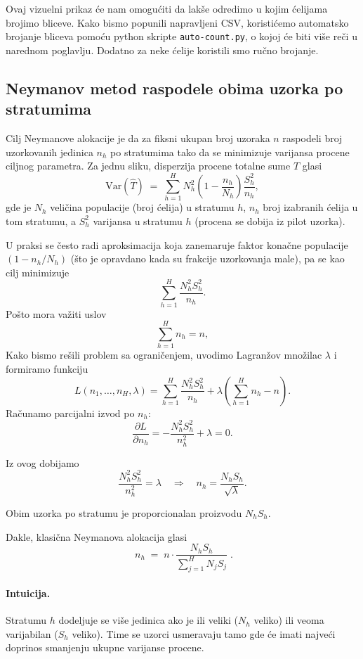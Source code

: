 \documentclass[a4paper,12pt]{article}
\begin{document}
\noindent
Ovaj vizuelni prikaz će nam omogućiti da lakše odredimo u kojim ćelijama brojimo bliceve. 
Kako bismo popunili napravljeni CSV, koristićemo automatsko brojanje bliceva pomoću python skripte \texttt{auto-count.py}, o kojoj će biti više
reči u narednom poglavlju. Dodatno za neke ćelije koristili smo ručno brojanje.

\subsection{Neymanov metod raspodele obima uzorka po stratumima}
\noindent

Cilj Neymanove alokacije je da za fiksni ukupan broj uzoraka $n$ raspodeli broj uzorkovanih jedinica $n_h$ po stratumima tako da se minimizuje varijansa procene ciljnog parametra.  
Za jednu sliku, disperzija procene totalne sume $\hat T$ glasi
\[
\mathrm{Var}(\hat T) \;=\; \sum_{h=1}^H N_h^2 \left(1-\frac{n_h}{N_h}\right)\frac{S_h^2}{n_h},
\]
gde je $N_h$ veličina populacije (broj ćelija) u stratumu $h$, $n_h$ broj izabranih ćelija u tom stratumu, a $S_h^2$ varijansa u stratumu $h$ (procena se dobija iz pilot uzorka).  

U praksi se često radi aproksimacija koja zanemaruje faktor konačne populacije $(1 - n_h/N_h)$ (što je opravdano kada su frakcije uzorkovanja male), pa se kao cilj minimizuje
\[
\sum_{h=1}^H \frac{N_h^2 S_h^2}{n_h}.
\]
Pošto mora važiti uslov
\[
\sum_{h=1}^H n_h = n,
\]
Kako bismo rešili problem sa ograničenjem, uvodimo Lagranžov množilac $\lambda$ i formiramo funkciju
\[
L(n_1, \dots, n_H, \lambda) = \sum_{h=1}^H \frac{N_h^2 S_h^2}{n_h} 
+ \lambda \left( \sum_{h=1}^H n_h - n \right).
\]
Računamo parcijalni izvod po $n_h$:
\[
\frac{\partial L}{\partial n_h} = -\frac{N_h^2 S_h^2}{n_h^2} + \lambda = 0.
\]

Iz ovog dobijamo
\[
\frac{N_h^2 S_h^2}{n_h^2} = \lambda
\quad \Rightarrow \quad
n_h = \frac{N_h S_h}{\sqrt{\lambda}}.
\]

Obim uzorka po stratumu je proporcionalan proizvodu $N_h S_h$.


Dakle, klasična Neymanova alokacija glasi
\[
\boxed{ \; n_h \;=\; n \cdot \frac{N_h S_h}{\sum_{j=1}^H N_j S_j} \; }.
\]

\paragraph{Intuicija.} Stratumu $h$ dodeljuje se više jedinica ako je ili veliki ($N_h$ veliko) ili veoma varijabilan ($S_h$ veliko). Time se uzorci usmeravaju tamo gde će imati najveći doprinos smanjenju ukupne varijanse procene.
\end{document}
